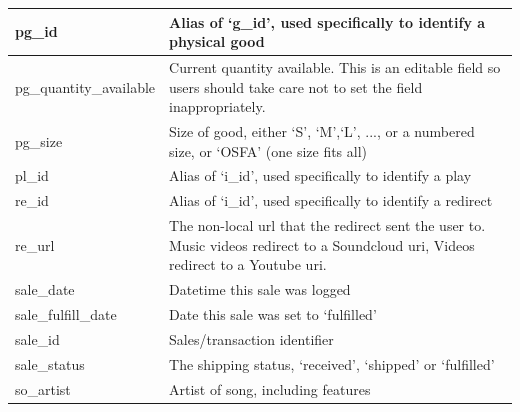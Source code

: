 \documentclass[11pt, a4paper]{report}
\begin{document}
\begin{longtable}{|l|p{10cm}|}
pg\_id                  & Alias of `g\_id', used specifically to identify a physical good                                                                                                        \\ \hline
pg\_quantity\_available & Current quantity available. This is an editable field so users should take care not to set the field inappropriately.                                                 \\ \hline
pg\_size                & Size of good, either `S', `M',`L', ..., or a numbered size, or `OSFA' (one size fits all)                                                                             \\ \hline
pl\_id                  & Alias of `i\_id', used specifically to identify a play                                                                                                                  \\ \hline
re\_id                  & Alias of `i\_id', used specifically to identify a redirect                                                                                                             \\ \hline
re\_url                 & The non-local url that the redirect sent the user to. Music videos redirect to a Soundcloud uri, Videos redirect to a Youtube uri.                                    \\ \hline
sale\_date              & Datetime this sale was logged                                                                                                                                         \\ \hline
sale\_fulfill\_date     & Date this sale was set to `fulfilled'                                                                                                                                 \\ \hline
sale\_id                & Sales/transaction identifier                                                                                                                                          \\ \hline
sale\_status            & The shipping status, `received', `shipped' or `fulfilled'                                                                                                             \\ \hline
so\_artist              & Artist of song, including features                                                                                                                                    \\ \hline

\end{longtable}
\end{document}
